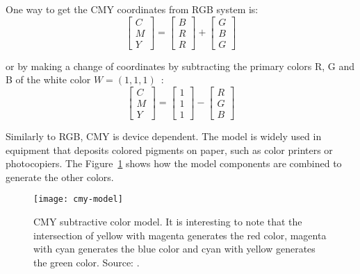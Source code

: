 One way to get the CMY coordinates from RGB system is:\\
\begin{equation}
  \begin{bmatrix}
    C \\ M \\ Y
  \end{bmatrix} = 
  \begin{bmatrix}
    B \\ R \\ R
  \end{bmatrix} +
  \begin{bmatrix}
    G \\ B \\ G
  \end{bmatrix}
\end{equation}

\noindent or by making a change of coordinates by subtracting the primary colors R, G and B of the white color $W = (1, 1, 1)$~\citep{gonzalez:02}:
\begin{equation}
  \begin{bmatrix}
    C \\ M \\ Y
  \end{bmatrix} = 
  \begin{bmatrix}
    1 \\ 1 \\ 1
  \end{bmatrix} -
  \begin{bmatrix}
    R \\ G \\ B
  \end{bmatrix}
\end{equation}

Similarly to RGB, CMY is device dependent. The model is widely used in equipment that deposits colored pigments on paper, such as color printers or photocopiers. The Figure~\ref{fig:cmy-model} shows how the model components are combined to generate the other colors.

\begin{figure}[!ht]
  \centering
  \texttt{[image: cmy-model]}
  \caption[CMY subtractive color model]{CMY subtractive color model. It is interesting to note that the intersection of yellow with magenta generates the red color, magenta with cyan generates the blue color and cyan with yellow generates the green color. Source: \citet{rus:08}.}
  \label{fig:cmy-model}
\end{figure}

